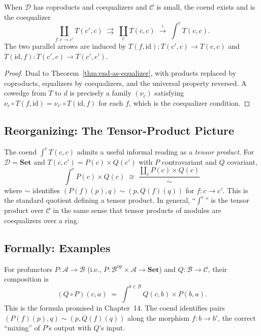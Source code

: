 \begin{theorem}
\label{thm:coend-as-coequalizer}
When $\mathcal{D}$ has coproducts and coequalizers and $\mathcal{C}$ is small,
the coend exists and is the coequalizer
\begin{equation*}
  \coprod_{f : c \to c'} T(c', c) \;\rightrightarrows\; \coprod_c T(c, c)
  \;\xrightarrow{\;\iota\;}\; \int^c T(c, c).
\end{equation*}
The two parallel arrows are induced by $T(f, \mathrm{id}) : T(c', c) \to
T(c, c)$ and $T(\mathrm{id}, f) : T(c', c) \to T(c', c')$.
\end{theorem}

\begin{proof}
Dual to Theorem~\ref{thm:end-as-equalizer}, with products replaced by
coproducts, equalizers by coequalizers, and the universal property reversed.
A cowedge from $T$ to $d$ is precisely a family $(\nu_c)$ satisfying
$\nu_c \circ T(f, \mathrm{id}) = \nu_{c'} \circ T(\mathrm{id}, f)$ for each
$f$, which is the coequalizer condition.
\end{proof}

\subsection{Reorganizing: The Tensor-Product Picture}

The coend $\int^c T(c, c)$ admits a useful informal reading as a \emph{tensor
product}. For $\mathcal{D} = \mathbf{Set}$ and $T(c, c') = P(c) \times Q(c')$
with $P$ contravariant and $Q$ covariant,
\begin{equation*}
  \int^c P(c) \times Q(c)
  \;\cong\;
  \frac{\coprod_c P(c) \times Q(c)}{\sim}
\end{equation*}
where $\sim$ identifies $(P(f)(p), q) \sim (p, Q(f)(q))$ for $f : c \to c'$.
This is the standard quotient defining a tensor product. In general,
``$\int^c$'' is the tensor product over $\mathcal{C}$ in the same sense that
tensor products of modules are coequalizers over a ring.

\subsection{Formally: Examples}

\begin{example_thm}
\label{ex:profunctor-composition}
For profunctors $P : \mathcal{A} \to \mathcal{B}$ (i.e., $P :
\mathcal{B}^{\mathrm{op}} \times \mathcal{A} \to \mathbf{Set}$) and $Q :
\mathcal{B} \to \mathcal{C}$, their composition is
\begin{equation*}
  (Q \circ P)(c, a) \;=\; \int^{b \in \mathcal{B}} Q(c, b) \times P(b, a).
\end{equation*}
This is the formula promised in Chapter~14. The coend identifies pairs
$(P(f)(p), q) \sim (p, Q(f)(q))$ along the morphism $f : b \to b'$, the
correct ``mixing'' of $P$'s output with $Q$'s input.
\end{example_thm}

